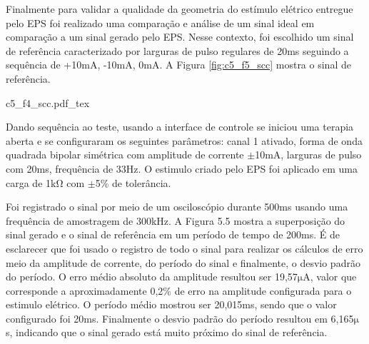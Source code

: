 






Finalmente para validar a qualidade da geometria do estímulo elétrico entregue pelo EPS foi realizado uma comparação e análise de um sinal ideal em comparação a um sinal gerado pelo EPS. Nesse contexto, foi escolhido um sinal de referência caracterizado por larguras de pulso regulares de 20ms seguindo a sequência de +10mA, -10mA, 0mA. A Figura \ref{fig:c5_f5_scc} mostra o sinal de referência.

\vspace{1cm}
\begin{figure*}[h]
    \centering %
    \small %
    \def\svgwidth{1\columnwidth}%
    {c5_f4_scc.pdf_tex}
    \caption{Sinal de referência para comparação com sinal real fornecido pelo \acrshort{EPS}.}
    \label{fig:c5_f5_scc}
\end{figure*}


Dando sequência ao teste, usando a interface de controle se iniciou uma terapia aberta e se configuraram os seguintes parâmetros: canal 1 ativado, forma de onda quadrada bipolar simétrica com amplitude de corrente $\mathrm{\pm}$10mA, larguras de pulso com 20ms, frequência de 33Hz. O estimulo criado pelo EPS foi aplicado em uma carga de 1k$\mathrm{\Omega}$ com $\mathrm{\pm}$5\% de tolerância. 

Foi registrado o sinal por meio de um osciloscópio durante 500ms usando uma frequência de amostragem de 300kHz. A Figura 5.5 mostra a superposição do sinal gerado e o sinal de referência em um período de tempo de 200ms. É de esclarecer que foi usado o registro de todo o sinal para realizar os cálculos de erro meio da amplitude de corrente, do período do sinal e finalmente, o desvio padrão do período. O erro médio absoluto da amplitude resultou ser 19,57$\mathrm{\mu}$A, valor que corresponde a aproximadamente 0,2\% de erro na amplitude configurada para o estimulo elétrico. O período médio mostrou ser 20,015ms, sendo que o valor configurado foi 20ms. Finalmente o desvio padrão do período resultou em 6,165$\mathrm{\mu}$s, indicando que o sinal gerado está muito próximo do sinal de referência.


